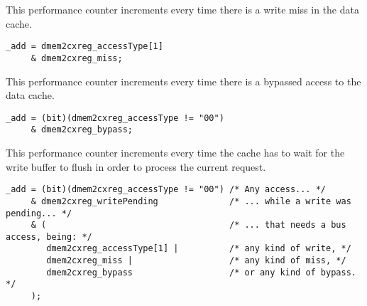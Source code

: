 
This performance counter increments every time there is a write miss in the data 
cache.

\implementation{}
\begin{lstlisting}
_add = dmem2cxreg_accessType[1]
     & dmem2cxreg_miss;
\end{lstlisting}


This performance counter increments every time there is a bypassed access to the 
data cache.

\implementation{}
\begin{lstlisting}
_add = (bit)(dmem2cxreg_accessType != "00")
     & dmem2cxreg_bypass;
\end{lstlisting}


This performance counter increments every time the cache has to wait for the
write buffer to flush in order to process the current request.

\implementation{}
\begin{lstlisting}
_add = (bit)(dmem2cxreg_accessType != "00") /* Any access... */
     & dmem2cxreg_writePending              /* ... while a write was pending... */
     & (                                    /* ... that needs a bus access, being: */
        dmem2cxreg_accessType[1] |          /* any kind of write, */
        dmem2cxreg_miss |                   /* any kind of miss, */
        dmem2cxreg_bypass                   /* or any kind of bypass. */
     );
\end{lstlisting}

